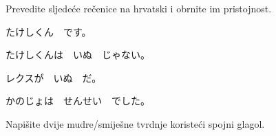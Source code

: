 
\author{Ivan Petranović}

	
	\begin{mondai}{Prevedite sljedeće rečenice na hrvatski i obrnite im pristojnost.}
		\item たけしくん　です。
		\item たけしくんは　いぬ　じゃない。
		\item レクスが　いぬ　だ。
		\item かのじょは　せんせい　でした。
	\end{mondai}

	Napišite dvije mudre/smiješne tvrdnje koristeći spojni glagol.

